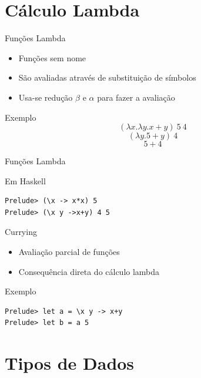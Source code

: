 \documentclass{beamer}
\begin{document}
	\section{Cálculo Lambda}
	
		\begin{frame}{}
		\end{frame}

		\begin{frame}{Funções Lambda}
		 
		 \begin{itemize}
		  \item Funções sem nome
		  \item São avaliadas através de substituição de símbolos
		  \item Usa-se redução $\beta$ e $\alpha$ para fazer a avaliação
		 \end{itemize}
		 
		 \begin{block}{Exemplo}
		  \[(\lambda x. \lambda y. x+y)~ 5~ 4\]
		  \[(\lambda y. 5+y)~ 4\]
		  \[5+4\]		  
		 \end{block}		 
		\end{frame}
		
	\begin{frame}[fragile]{Funções Lambda}
	 
	 \begin{block}{Em Haskell}
	  \begin{lstlisting}	
Prelude> (\x -> x*x) 5
Prelude> (\x y ->x+y) 4 5
	  \end{lstlisting}	  
	 \end{block}
	\end{frame}

	\begin{frame}[fragile]{Currying}
		\begin{itemize}
			\item Avaliação parcial de funções
			\item Consequência direta do cálculo lambda
		\end{itemize}
		\begin{block}{Exemplo}
		 \begin{lstlisting}
Prelude> let a = \x y -> x+y
Prelude> let b = a 5
		 \end{lstlisting}
		\end{block}
	\end{frame}	
	
	\section{Tipos de Dados}
	
\end{document}
